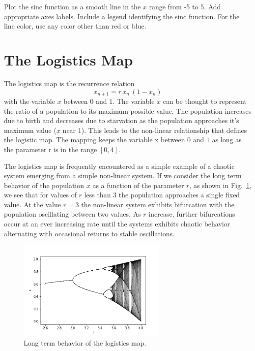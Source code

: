 \plot \begin{plot} \end{plot}
Plot the sinc function as a smooth line in the $x$ range from -5 to 5.  Add appropriate axes labels.  Include a legend identifying the sinc function.  For the line color, use any color other than red or blue.




\section{The Logistics Map}
The logistics map is the recurrence relation
\begin{displaymath}
x_{n+1} = r \, x_n \, (1 - x_n)
\end{displaymath}
with the variable $x$ between $0$ and $1$.  The variable $x$ can be
thought to represent the ratio of a population to its maximum possible
value.  The population increases due to birth and decreases due to
starvation as the population approaches it's maximum value ($x$ near
1).  This leads to the non-linear relationship that defines the
logistic map.  The mapping keeps the variable x between $0$ and $1$ as
long as the parameter r is in the range $[0,4]$.

The logistics map is frequently encountered as a simple example of a
chaotic system emerging from a simple non-linear system.  If we
consider the long term behavior of the population $x$ as a function of
the parameter $r$, as shown in Fig.~\ref{fig:logmap}, we see that for
values of $r$ less than $3$ the population approaches a single fixed
value.  At the value $r=3$ the non-linear system exhibits bifurcation
with the population oscillating between two values.  As $r$ increase,
further bifurcations occur at an ever increasing rate until the
systems exhibits chaotic behavior alternating with occasional returns
to stable oscillations.

\begin{figure}[htbp]
\begin{center}
\includegraphics[width=0.65\textwidth]{figs/plotting/bifurcation.png} 
\caption{Long term behavior of the logistics map.}
\label{fig:logmap}
\end{center}
\end{figure}

